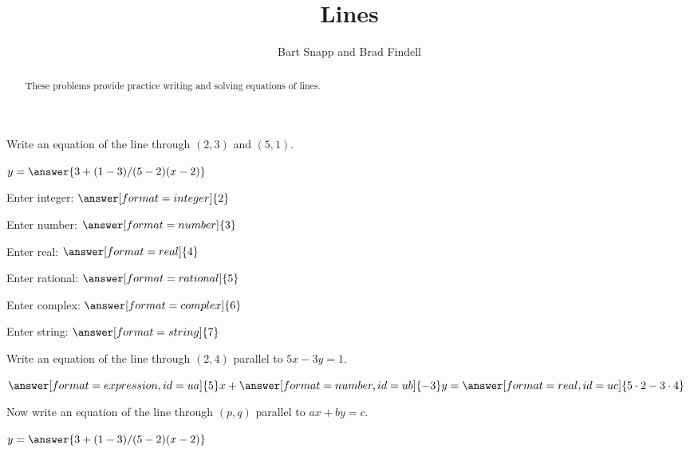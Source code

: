 \documentclass[nooutcomes]{ximera}
\title{Lines}
\author{Bart Snapp and Brad Findell}
\begin{document}
\begin{abstract}
These problems provide practice writing and solving equations of lines. 
\end{abstract}
\maketitle

\begin{problem}
Write an equation of the line through $(2,3)$ and $(5,1)$.  

\begin{prompt}
$y = \answer{3+(1-3)/(5-2)(x-2)}$

Enter integer: $\answer[format=integer]{2}$

Enter number: $\answer[format=number]{3}$

Enter real: $\answer[format=real]{4}$

Enter rational: $\answer[format=rational]{5}$

Enter complex: $\answer[format=complex]{6}$

Enter string: $\answer[format=string]{7}$
\end{prompt}
\end{problem}


\begin{problem}
Write an equation of the line through $(2,4)$ parallel to $5x-3y=1$.  

  \begin{prompt}
    \begin{validator}[(-3*ua==5*ub) && (-3*uc==(5*2-3*4)*ub) && (ub != 0)]
      \(
         \answer[format=expression,id=ua]{5}x + \answer[format=number,id=ub]{-3}y = 
         \answer[format=real,id=uc]{5\cdot2-3\cdot4}
      \)
    \end{validator}
  \end{prompt}
\end{problem}



\begin{problem}
Now write an equation of the line through $(p,q)$ parallel to $ax+by=c$. 

\begin{prompt}
$y = \answer{3+(1-3)/(5-2)(x-2)}$
\end{prompt}
\end{problem}
\end{document}
